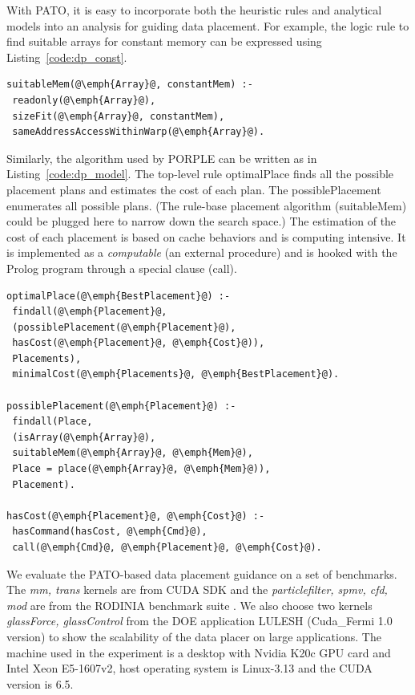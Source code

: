 With PATO, it is easy to incorporate both the heuristic rules
and analytical models into an analysis for guiding data placement.
For example, the logic rule to find suitable arrays for constant
memory can be expressed using Listing~\ref{code:dp_const}.
\begin{lstlisting}[xleftmargin=.05\columnwidth,
xrightmargin=.05\columnwidth,escapechar=@, 
caption=Rule for using constant memory, label=code:dp_const]
suitableMem(@\emph{Array}@, constantMem) :-
 readonly(@\emph{Array}@), 
 sizeFit(@\emph{Array}@, constantMem),
 sameAddressAccessWithinWarp(@\emph{Array}@).
\end{lstlisting}

Similarly, the algorithm used by PORPLE can be written as in
Listing~\ref{code:dp_model}.  The top-level rule \textsf{optimalPlace}
finds all the possible placement plans and estimates the cost of each
plan.  The \textsf{possiblePlacement} enumerates all possible plans.
(The rule-base placement algorithm (\textsf{suitableMem}) could be
plugged here to narrow down the search space.)  The estimation of the
cost of each placement is based on cache behaviors and is computing
intensive.  It is implemented as a {\em computable} (an external
procedure) and is hooked with the Prolog program through a special
clause (\textsf{call}).

\begin{lstlisting}[xleftmargin=.05\columnwidth,
xrightmargin=.05\columnwidth,escapechar=@, 
float=h, caption=Rules for PORPLE algorithm, label=code:dp_model]
optimalPlace(@\emph{BestPlacement}@) :-
 findall(@\emph{Placement}@, 
 (possiblePlacement(@\emph{Placement}@),
 hasCost(@\emph{Placement}@, @\emph{Cost}@)),
 Placements),
 minimalCost(@\emph{Placements}@, @\emph{BestPlacement}@).
 
possiblePlacement(@\emph{Placement}@) :-
 findall(Place,
 (isArray(@\emph{Array}@),
 suitableMem(@\emph{Array}@, @\emph{Mem}@),
 Place = place(@\emph{Array}@, @\emph{Mem}@)),
 Placement).
 
hasCost(@\emph{Placement}@, @\emph{Cost}@) :-
 hasCommand(hasCost, @\emph{Cmd}@),
 call(@\emph{Cmd}@, @\emph{Placement}@, @\emph{Cost}@).
\end{lstlisting}

\vspace*{.1in} 
We evaluate the PATO-based data placement guidance on a set of benchmarks. The \emph{mm, trans} kernels are from CUDA SDK and the \emph{particlefilter, spmv, cfd, mod} are from the RODINIA benchmark suite \cite{Che2009}.
We also choose two kernels \emph{glassForce, glassControl} from the DOE application LULESH (Cuda\_Fermi 1.0 version) \cite{LULESH1.0} to show the scalability of the data placer on large applications.
The machine used in the experiment is a desktop with Nvidia K20c GPU card and Intel Xeon E5-1607v2, host operating system is Linux-3.13 and the CUDA version is 6.5.

